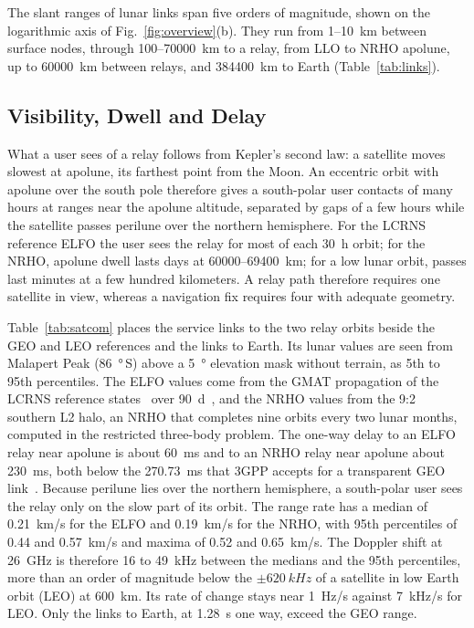 \documentclass{IEEEoj}
\begin{document}
The slant ranges of lunar links span five orders of magnitude, shown on the logarithmic axis of Fig.~\ref{fig:overview}(b). They run from \SI{1}{}--\SI{10}{km} between surface nodes, through \SI{100}{}--\SI{70000}{km} to a relay, from LLO to NRHO apolune, up to \SI{60000}{km} between relays, and \SI{384400}{km} to Earth (Table~\ref{tab:links}). 




\subsection{Visibility, Dwell and Delay}
\label{sec:visibility}
What a user sees of a relay follows from Kepler's second law: a satellite moves slowest at apolune, its farthest point from the Moon. An eccentric orbit with apolune over the south pole therefore gives a south-polar user contacts of many hours at ranges near the apolune altitude, separated by gaps of a few hours while the satellite passes perilune over the northern hemisphere. For the LCRNS reference ELFO the user sees the relay for most of each \SI{30}{h} orbit; for the NRHO, apolune dwell lasts days at \SI{60000}{}--\SI{69400}{km}; for a low lunar orbit, passes last minutes at a few hundred kilometers. A relay path therefore requires one satellite in view, whereas a navigation fix requires four with adequate geometry.

Table~\ref{tab:satcom} places the service links to the two relay orbits beside the GEO and LEO references and the links to Earth. Its lunar values are seen from Malapert Peak (\SI{86}{\degree}\,S) above a \SI{5}{\degree} elevation mask without terrain, as 5th to 95th percentiles. The ELFO values come from the GMAT propagation of the LCRNS reference states~\cite{lcrns_ref_const} over \SI{90}{d}~\cite{asok2027space}, and the NRHO values from the 9:2 southern L2 halo, an NRHO that completes nine orbits every two lunar months, computed in the restricted three-body problem. The one-way delay to an ELFO relay near apolune is about \SI{60}{ms} and to an NRHO relay near apolune about \SI{230}{ms}, both below the \SI{270.73}{ms} that 3GPP accepts for a transparent GEO link~\cite{3gpp_tr_38821}. Because perilune lies over the northern hemisphere, a south-polar user sees the relay only on the slow part of its orbit. The range rate has a median of \SI{0.21}{km/s} for the ELFO and \SI{0.19}{km/s} for the NRHO, with 95th percentiles of \SI{0.44}{} and \SI{0.57}{km/s} and maxima of \SI{0.52}{} and \SI{0.65}{km/s}. The Doppler shift at \SI{26}{GHz} is therefore \SI{16}{} to \SI{49}{kHz} between the medians and the 95th percentiles, more than an order of magnitude below the $\pm\SI{620}{kHz}$ of a satellite in low Earth orbit (LEO) at \SI{600}{km}. Its rate of change stays near \SI{1}{Hz/s} against \SI{7}{kHz/s} for LEO. Only the links to Earth, at \SI{1.28}{\second} one way, exceed the GEO range.
\end{document}
